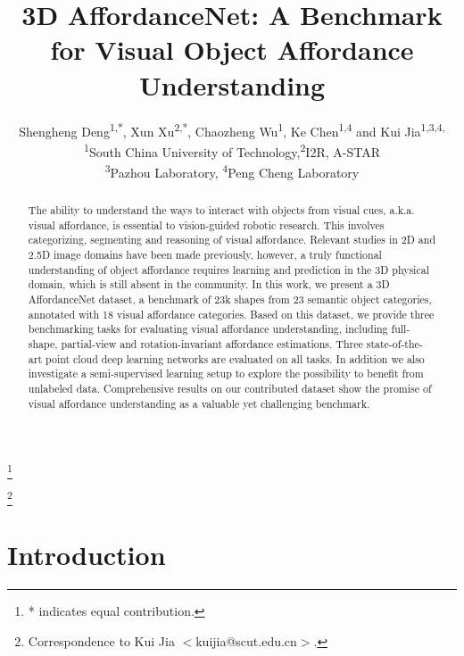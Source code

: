 \documentclass[final]{cvpr}
\begin{document}
\title{3D AffordanceNet: A Benchmark for Visual Object Affordance Understanding}





\author{Shengheng Deng\textsuperscript{1,*},
Xun Xu\textsuperscript{2,*}, Chaozheng Wu\textsuperscript{1},
Ke Chen\textsuperscript{1,4} and Kui Jia\textsuperscript{1,3,4,\textdagger}\\
\textsuperscript{1}South China University of Technology,\quad \textsuperscript{2}I2R, A-STAR\\ \textsuperscript{3}Pazhou Laboratory, \quad \textsuperscript{4}Peng Cheng Laboratory\\
}

\maketitle
\let\thefootnote\relax\footnote{* indicates equal contribution.}

\let\thefootnote\relax\footnote{\textsuperscript{\textdagger}Correspondence to Kui Jia $<$kuijia@scut.edu.cn$>$.}

\begin{abstract}
The ability to understand the ways to interact with objects from visual cues, a.k.a. visual affordance, is essential to vision-guided robotic research. This involves categorizing, segmenting and reasoning of visual affordance. Relevant studies in 2D and 2.5D image domains have been made previously, however, a truly functional understanding of object affordance requires learning and prediction in the 3D physical domain, which is still absent in the community. In this work, we present a 3D AffordanceNet dataset, a benchmark of 23k shapes from 23 semantic object categories, annotated with 18 visual affordance categories. Based on this dataset, we provide three benchmarking tasks for evaluating visual affordance understanding, including full-shape, partial-view and rotation-invariant affordance estimations. Three state-of-the-art point cloud deep learning networks are evaluated on all tasks. In addition we also investigate a semi-supervised learning setup to explore the possibility to benefit from unlabeled data. Comprehensive results on our contributed dataset show the promise of visual affordance understanding as a valuable yet challenging benchmark.  
\end{abstract}

\section{Introduction}
\end{document}
